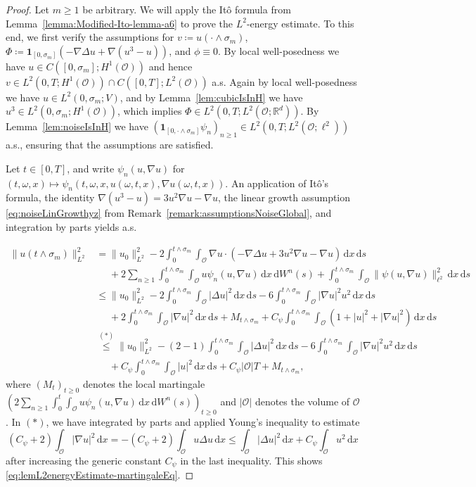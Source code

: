 \documentclass[reqno]{amsart}
\newcommand{\R}{\mathbb{R}}
\newcommand{\sO}{\mathscr{O}}
\newcommand{\ce}{\coloneqq}
\newcommand{\1}{\mathbf{1}}
\newcommand{\grad}{\nabla}
\newcommand{\ds}{\,\mathrm{d}s}
\newcommand{\dx}{\,\mathrm{d}x}
\newcommand{\dWsn}{\,\mathrm{d}W^n(s)}
\newcommand{\intt}{\int_0^t}
\newcommand{\inttm}{\int_0^{t\wedge\sigma_m}}
\newcommand{\intsO}{\int_{\sO}}
\begin{document}
    \begin{proof}   
    
 Let $m \geq 1$ be arbitrary. We will apply the Itô formula from
    Lemma~\ref{lemma:Modified-Ito-lemma-a6} to prove the $L^2$-energy estimate. To this
    end, we first verify the assumptions for $v \ce u(\cdot \wedge \sigma_m)$, $\Phi \ce \1_{[0,\sigma_m]}(-\grad \Delta u + \grad (u^3-u))$, and $\phi\equiv 0$. By local well-posedness we have $u\in C([0,\sigma_m];H^1(\sO))$ and hence $v\in L^2(0, T; H^1(\sO))\cap C([0,T];L^2(\sO))$ a.s. Again by local well-posedness we have $u\in L^2(0,\sigma_m; V)$, and by Lemma~\ref{lem:cubicIsInH}  we have $u^3 \in L^2(0,\sigma_m; H^1(\sO))$, which implies $\Phi\in L^2(0,T;L^2(\sO;\R^d))$. By Lemma~\ref{lem:noiseIsInH} we have $(\1_{[0,\cdot\wedge\sigma_m]}\psi_n)_{n\geq 1} \in L^2(0,T; L^2(\sO; \ell^2))$ a.s., ensuring that the assumptions are satisfied.
    
    Let $t\in[0,T]$, and write $\psi_n(u,\grad u)$ for $(t,\omega,x) \mapsto \psi_n(t,\omega,x,u(\omega,t,x), \grad u(\omega,t,x))$. An application of Itô's formula,  the identity $\grad(u^3-u)=3u^2\grad u-\grad u$, the linear growth assumption \eqref{eq:noiseLinGrowthyz} from Remark~\ref{remark:assumptionsNoiseGlobal}, 
    and integration by parts yields a.s.\

        \begin{equation}\label{eq:L2energy-calc1}
      \begin{aligned}
        \|u(t\wedge\sigma_m)\|_{L^2}^2 &= \|u_0\|_{L^2}^2  - 2 \inttm \intsO \nabla u \cdot (-\grad \Delta u + 3u^2 \grad u- \grad u) \dx\ds  \\
         & \phantom{\le } + 2 \sum_{n \geq 1}  \inttm \intsO  u \psi_n(u,\grad u) \dx \dWsn  +  \inttm \intsO \|\psi(u,\grad u)\|_{\ell^2}^2 \dx \ds \\
        & \leq \|u_0\|_{L^2}^2 - 2 \inttm \intsO |\Delta u|^2 \dx\ds - 6 \inttm \intsO|\nabla u|^2 u^2  \dx\ds   \\
        & \phantom{\le }+ 2 \inttm \intsO |\nabla u|^2  \dx\ds + M_{t \land \sigma_m}
        +  C_\psi \inttm \intsO (1+|u|^2+|\grad u|^2)\dx\ds \\
        &\overset{(*)}{\le} \|u_0\|_{L^2}^2-(2-1) \inttm \intsO |\Delta u|^2\dx\ds - 6  \inttm \intsO |\grad u|^2u^2\dx\ds  \\
        & \phantom{\le } + C_\psi \inttm \intsO |u|^2\dx\ds +C_\psi|\sO|T
        +M_{t \land \sigma_m},
    \end{aligned}
    \end{equation}
    where $(M_t)_{t\ge 0}$ denotes the local martingale $(2 \sum_{n \geq 1}  \intt\intsO   u \psi_n(u,\grad u) \dx \dWsn)_{t\ge 0}$ and $|\sO|$ denotes the volume of $\sO$.
    In $(*)$, we have integrated by parts and applied Young's inequality to estimate
    \begin{equation*}
       (C_\psi+2) \intsO |\grad u|^2\dx = -(C_\psi+2) \intsO u \Delta u \dx \le  \intsO |\Delta u|^2\dx + C_\psi\intsO u^2\dx
    \end{equation*}
    after increasing the generic constant $C_\psi$ in the last inequality. This shows \eqref{eq:lemL2energyEstimate-martingaleEq}.
    

\end{proof}
\end{document}
